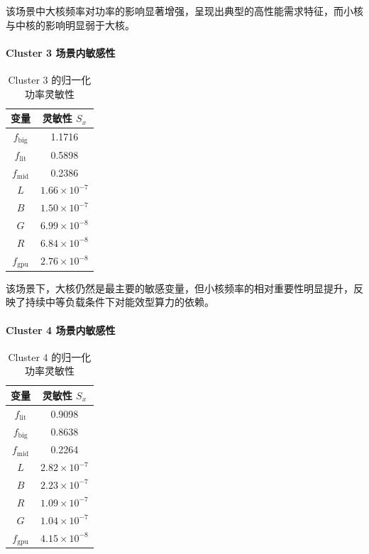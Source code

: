 \documentclass[11pt]{article}
\begin{document}
该场景中大核频率对功率的影响显著增强，呈现出典型的高性能需求特征，而小核与中核的影响明显弱于大核。


\paragraph{Cluster 3 场景内敏感性}

\begin{table}[H]
\centering
\caption{Cluster 3 的归一化功率灵敏性}
\begin{tabular}{cc}
\hline
变量 & 灵敏性 $S_x$ \\ \hline
$f_{\mathrm{big}}$ & 1.1716 \\
$f_{\mathrm{lit}}$ & 0.5898 \\
$f_{\mathrm{mid}}$ & 0.2386 \\
$L$ & $1.66\times10^{-7}$ \\
$B$ & $1.50\times10^{-7}$ \\
$G$ & $6.99\times10^{-8}$ \\
$R$ & $6.84\times10^{-8}$ \\
$f_{\mathrm{gpu}}$ & $2.76\times10^{-8}$ \\ \hline
\end{tabular}
\end{table}

该场景下，大核仍然是最主要的敏感变量，但小核频率的相对重要性明显提升，反映了持续中等负载条件下对能效型算力的依赖。


\paragraph{Cluster 4 场景内敏感性}

\begin{table}[H]
\centering
\caption{Cluster 4 的归一化功率灵敏性}
\begin{tabular}{cc}
\hline
变量 & 灵敏性 $S_x$ \\ \hline
$f_{\mathrm{lit}}$ & 0.9098 \\
$f_{\mathrm{big}}$ & 0.8638 \\
$f_{\mathrm{mid}}$ & 0.2264 \\
$L$ & $2.82\times10^{-7}$ \\
$B$ & $2.23\times10^{-7}$ \\
$R$ & $1.09\times10^{-7}$ \\
$G$ & $1.04\times10^{-7}$ \\
$f_{\mathrm{gpu}}$ & $4.15\times10^{-8}$ \\ \hline
\end{tabular}
\end{table}
\end{document}
